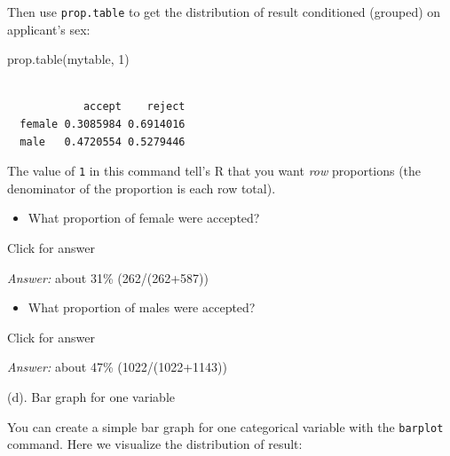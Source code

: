 \documentclass[
]{book}
\newenvironment{Shaded}{\begin{snugshade}}{\end{snugshade}}
\newcommand{\DecValTok}[1]{\textcolor[rgb]{0.00,0.00,0.81}{#1}}
\newcommand{\FunctionTok}[1]{\textcolor[rgb]{0.00,0.00,0.00}{#1}}
\newcommand{\NormalTok}[1]{#1}
\newcommand{\OtherTok}[1]{\textcolor[rgb]{0.56,0.35,0.01}{#1}}
\newcommand{\SpecialCharTok}[1]{\textcolor[rgb]{0.00,0.00,0.00}{#1}}
\providecommand{\tightlist}{%
  \setlength{\itemsep}{0pt}\setlength{\parskip}{0pt}}
\begin{document}
\begin{Shaded}
\end{Shaded}

Then use \texttt{prop.table} to get the distribution of result conditioned (grouped) on applicant's sex:

\begin{Shaded}
\begin{Highlighting}[]
\FunctionTok{prop.table}\NormalTok{(mytable, }\DecValTok{1}\NormalTok{)}
\end{Highlighting}
\end{Shaded}

\begin{verbatim}
        
            accept    reject
  female 0.3085984 0.6914016
  male   0.4720554 0.5279446
\end{verbatim}

The value of \texttt{1} in this command tell's R that you want \emph{row} proportions (the denominator of the proportion is each row total).

\begin{itemize}
\tightlist
\item
  What proportion of female were accepted?
\end{itemize}

Click for answer

\emph{Answer:} about 31\% (262/(262+587))

\begin{itemize}
\tightlist
\item
  What proportion of males were accepted?
\end{itemize}

Click for answer

\emph{Answer:} about 47\% (1022/(1022+1143))

(d). Bar graph for one variable

You can create a simple bar graph for one categorical variable with the \texttt{barplot} command. Here we visualize the distribution of result:

\begin{Shaded}
\end{Shaded}
\end{document}
